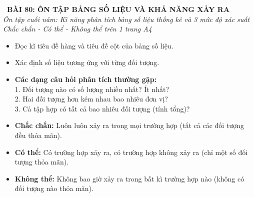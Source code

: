 \documentclass[11pt,a4paper]{article}
\begin{document}
\begin{tcolorbox}[
  enhanced,
  colback=white,
  colframe=primary,
  arc=3mm,
  boxrule=1.2pt,
  left=4mm, right=4mm, top=2.5mm, bottom=2.5mm,
  drop shadow=black!10!white
]
  \centering
  {\Large\bfseries\color{primary}\faBookmark\ BÀI 80: ÔN TẬP BẢNG SỐ LIỆU VÀ KHẢ NĂNG XẢY RA}\\[1.5mm]
  {\small\itshape\color{black!75}Ôn tập cuối năm: Kĩ năng phân tích bảng số liệu thống kê và 3 mức độ xác suất Chắc chắn - Có thể - Không thể trên 1 trang A4}
\end{tcolorbox}

\vspace{-2mm}


\noindent
\begin{minipage}[t]{0.49\textwidth}\vspace{0pt}
\begin{tcolorbox}[
  enhanced,
  colback=blue!4!white,
  colframe=blue!75!black,
  arc=2mm, boxrule=0.8pt,
  left=2mm, right=2mm, top=1.8mm, bottom=1.8mm,
  title={\footnotesize\bfseries\color{white}\faKey\ 1. Đọc và phân tích Bảng số liệu}
]
{\footnotesize
\begin{itemize}\setlength{\itemsep}{1.5pt}\setlength{\leftskip}{-2.5mm}
  \item Đọc kĩ tiêu đề hàng và tiêu đề cột của bảng số liệu.
  \item Xác định số liệu tương ứng với từng đối tượng.
  \item \textbf{Các dạng câu hỏi phân tích thường gặp:}\\
  1. Đối tượng nào có số lượng nhiều nhất? Ít nhất?\\
  2. Hai đối tượng hơn kém nhau bao nhiêu đơn vị?\\
  3. Cả tập hợp có tất cả bao nhiêu đối tượng (tính tổng)?
\end{itemize}
}
\end{tcolorbox}
\end{minipage}
\hfill
\begin{minipage}[t]{0.49\textwidth}\vspace{0pt}
\begin{tcolorbox}[
  enhanced,
  colback=teal!4!white,
  colframe=teal!75!black,
  arc=2mm, boxrule=0.8pt,
  left=2mm, right=2mm, top=1.8mm, bottom=1.8mm,
  title={\footnotesize\bfseries\color{white}\faSliders\ 2. Ba mức độ khả năng của sự kiện}
]
{\footnotesize
\begin{itemize}\setlength{\itemsep}{1.5pt}\setlength{\leftskip}{-2.5mm}
  \item \textbf{Chắc chắn:} Luôn luôn xảy ra trong mọi trường hợp (tất cả các đối tượng đều thỏa mãn).
  \item \textbf{Có thể:} Có trường hợp xảy ra, có trường hợp không xảy ra (chỉ một số đối tượng thỏa mãn).
  \item \textbf{Không thể:} Không bao giờ xảy ra trong bất kì trường hợp nào (không có đối tượng nào thỏa mãn).
\end{itemize}
}
\end{tcolorbox}
\end{minipage}
\end{document}
